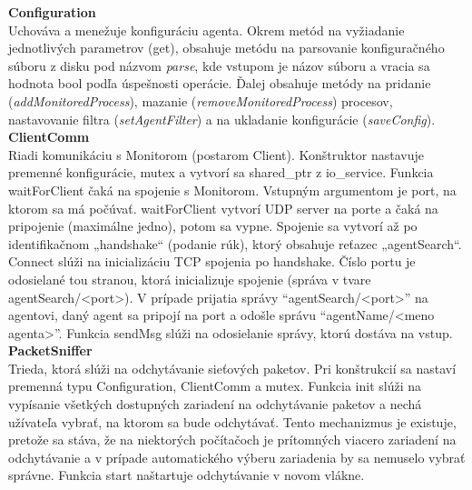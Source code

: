 \documentclass[a4paper,12pt]{article}
\begin{document}
\textbf{Configuration} \\

Uchováva a menežuje konfiguráciu agenta. Okrem metód na vyžiadanie jednotlivých parametrov (get), obsahuje metódu na parsovanie konfiguračného súboru z disku pod názvom \textit{parse}, kde vstupom je názov súboru a vracia sa hodnota bool podľa úspešnosti operácie. Ďalej obsahuje metódy na pridanie (\textit{addMonitoredProcess}), mazanie (\textit{removeMonitoredProcess}) procesov, nastavovanie filtra (\textit{setAgentFilter}) a na ukladanie konfigurácie (\textit{saveConfig}). \\

\textbf{ClientComm} \\

Riadi komunikáciu s Monitorom (postarom Client). Konštruktor nastavuje premenné konfigurácie, mutex a vytvorí sa shared\_ptr z io\_service. Funkcia waitForClient čaká na spojenie s Monitorom. Vstupným argumentom je port, na ktorom sa má počúvať. waitForClient vytvorí UDP server na porte a čaká na pripojenie (maximálne jedno), potom sa vypne. Spojenie sa vytvorí až po identifikačnom „handshake“ (podanie rúk), ktorý obsahuje reťazec „agentSearch“. Connect slúži na inicializáciu TCP spojenia po handshake. Číslo portu je odosielané tou stranou, ktorá inicializuje spojenie (správa v tvare agentSearch/<port>). V prípade prijatia správy “agentSearch/<port>” na agentovi, daný agent sa pripojí na port a odošle správu “agentName/<meno agenta>”. Funkcia sendMsg slúži na odosielanie správy, ktorú dostáva na vstup. 
 \\

\textbf{PacketSniffer} \\

Trieda, ktorá slúži na odchytávanie sieťových paketov. Pri konštrukcií sa nastaví premenná typu Configuration, ClientComm a mutex. Funkcia init slúži na vypísanie všetkých dostupných zariadení na odchytávanie paketov a nechá užívateľa vybrať, na ktorom sa bude odchytávať. Tento mechanizmus je existuje, pretože sa stáva, že na niektorých počítačoch je prítomných viacero zariadení na odchytávanie a v prípade automatického výberu zariadenia by sa nemuselo vybrať správne. Funkcia start naštartuje odchytávanie v novom vlákne.
\end{document}

